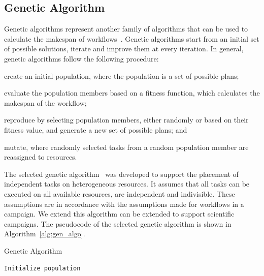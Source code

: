 \subsection{Genetic Algorithm}
\label{algo:gen}
Genetic algorithms represent another family of algorithms that can be  used to
calculate the makespan of workflows~\cite{dong2006scheduling}. Genetic
algorithms start from an initial set of possible solutions, iterate and
improve them at every iteration. In general, genetic algorithms follow the
following procedure:
\begin{inparaenum}[(i)]
    \item create an initial population, where the population is a set of
    possible plans;
    \item evaluate the population members based on a fitness function, which
    calculates the makespan of the workflow;
    \item reproduce by selecting population members, either randomly or based
    on their fitness value, and generate a new set of possible plans; and
    \item mutate, where randomly selected tasks from a random population
    member are reassigned to resources.
\end{inparaenum}

The selected genetic algorithm~\cite{page2005algorithm} was developed to
support the placement of independent tasks on heterogeneous resources. It
assumes that all tasks can be executed on all available resources, are
independent and indivisible. These assumptions are in accordance with the
assumptions made for workflows in a campaign. We extend this algorithm can be
extended to support scientific campaigns. The pseudocode of the selected
genetic algorithm is shown in Algorithm~\ref{alg:gen_algo}.

\begin{algorithm}[t]
    \caption{Genetic Algorithm}
    \label{alg:gen_algo}
    \scriptsize
    \begin{algorithmic}[1]
        \State \texttt{Initialize population}
        \EndWhile
        \EndProcedure
    \end{algorithmic}
\end{algorithm}

